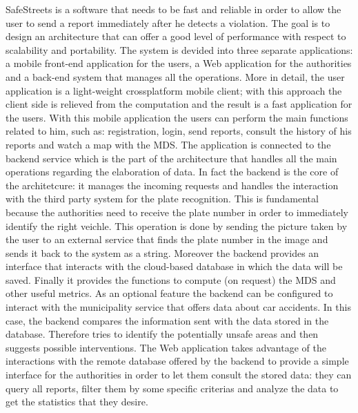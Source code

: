 SafeStreets is a software that needs to be fast and reliable in order to allow the user to send a report immediately after he detects a violation. The goal is to design an architecture that can offer a good level of performance with respect to scalability and portability. The system is devided into three separate applications: a mobile front-end application for the users, a Web application for the authorities and a back-end system that manages all the operations. More in detail, the user application is a light-weight crossplatform mobile client; with this approach the client side is relieved from the computation and the result is a fast application for the users. With this mobile application the users can perform the main functions related to him, such as: registration, login, send reports, consult the history of his reports and watch a map with the MDS. The application is connected to the backend service which is the part of the architecture that handles all the main operations regarding the elaboration of data. In fact the backend is the core of the architetcure: it manages the incoming requests and handles the interaction with the third party system for the plate recognition. This is fundamental because the authorities need to receive the plate number in order to immediately identify the right veichle. This operation is done by sending the picture taken by the user to an external service that finds the plate number in the image and sends it back to the system as a string. Moreover the backend provides an interface that interacts with the cloud-based database in which the data will be saved. Finally it provides the functions to compute (on request) the MDS and other useful metrics. As an optional feature the backend can be configured to interact with the municipality service that offers data about car accidents. In this case, the backend compares the information sent with the data stored in the database. Therefore tries to identify the potentially unsafe areas and then suggests possible interventions. The Web application takes advantage of the interactions with the remote database offered by the backend to provide a simple interface for the authorities in order to let them consult the stored data: they can query all reports, filter them by some specific criterias and analyze the data to get the statistics that they desire.
